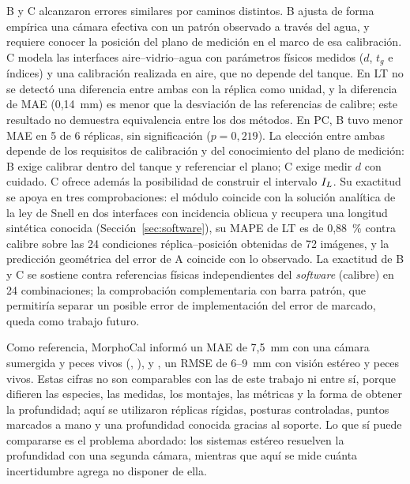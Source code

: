 B y C alcanzaron errores similares por caminos distintos. B ajusta de forma empírica una cámara efectiva con un patrón observado a través del agua, y requiere conocer la posición del plano de medición en el marco de esa calibración. C modela las interfaces aire--vidrio--agua con parámetros físicos medidos ($d$, $t_g$ e índices) y una calibración realizada en aire, que no depende del tanque. En LT no se detectó una diferencia entre ambas con la réplica como unidad, y la diferencia de MAE (0,14~mm) es menor que la desviación de las referencias de calibre; este resultado no demuestra equivalencia entre los dos métodos. En PC, B tuvo menor MAE en 5 de 6 réplicas, sin significación ($p = 0{,}219$). La elección entre ambas depende de los requisitos de calibración y del conocimiento del plano de medición: B exige calibrar dentro del tanque y referenciar el plano; C exige medir $d$ con cuidado. C ofrece además la posibilidad de construir el intervalo $I_L$. Su exactitud se apoya en tres comprobaciones: el módulo coincide con la solución analítica de la ley de Snell en dos interfaces con incidencia oblicua y recupera una longitud sintética conocida (Sección~\ref{sec:software}), su MAPE de LT es de 0,88~\% contra calibre sobre las 24 condiciones réplica--posición obtenidas de 72 imágenes, y la predicción geométrica del error de A coincide con lo observado. La exactitud de B y C se sostiene contra referencias físicas independientes del \emph{software} (calibre) en 24 combinaciones; la comprobación complementaria con barra patrón, que permitiría separar un posible error de implementación del error de marcado, queda como trabajo futuro.

Como referencia, MorphoCal informó un MAE de 7,5~mm con una cámara sumergida y peces vivos (\citeauthor{Vijayalakshmi2026}, \citeyear{Vijayalakshmi2026}), y \textcite{Seibold2026}, un RMSE de 6--9~mm con visión estéreo y peces vivos. Estas cifras no son comparables con las de este trabajo ni entre sí, porque difieren las especies, las medidas, los montajes, las métricas y la forma de obtener la profundidad; aquí se utilizaron réplicas rígidas, posturas controladas, puntos marcados a mano y una profundidad conocida gracias al soporte. Lo que sí puede compararse es el problema abordado: los sistemas estéreo resuelven la profundidad con una segunda cámara, mientras que aquí se mide cuánta incertidumbre agrega no disponer de ella.

